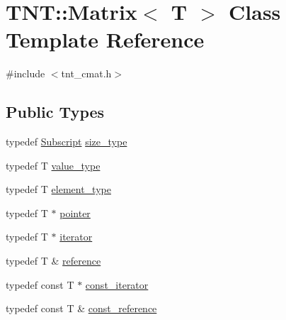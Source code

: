 \hypertarget{classTNT_1_1Matrix}{}\section{T\+NT\+:\+:Matrix$<$ T $>$ Class Template Reference}
\label{classTNT_1_1Matrix}


{\ttfamily \#include $<$tnt\+\_\+cmat.\+h$>$}

\subsection*{Public Types}
\begin{DoxyCompactItemize}
\item 
typedef \hyperlink{namespaceTNT_af22e3f1460e145c04ce4e7d701e4c1c1}{Subscript} \hyperlink{classTNT_1_1Matrix_a42f57fd19de0ba2edce3734f41431727}{size\+\_\+type}
\item 
typedef T \hyperlink{classTNT_1_1Matrix_a869b1a3e56a38bdaeb0b4f698b08e3c5}{value\+\_\+type}
\item 
typedef T \hyperlink{classTNT_1_1Matrix_a8ecf0a648bbfaf636fd78c21b35a0a4d}{element\+\_\+type}
\item 
typedef T $\ast$ \hyperlink{classTNT_1_1Matrix_aa7db7adc5513f7d8bf067965b97d7c42}{pointer}
\item 
typedef T $\ast$ \hyperlink{classTNT_1_1Matrix_a8233a1d03d4cfeab1d7cfec560cd2f0c}{iterator}
\item 
typedef T \& \hyperlink{classTNT_1_1Matrix_a129951783800dd85d3dcc1f6dd2062f9}{reference}
\item 
typedef const T $\ast$ \hyperlink{classTNT_1_1Matrix_a39334142ce0b5ee917e7b222a6b5637b}{const\+\_\+iterator}
\item 
typedef const T \& \hyperlink{classTNT_1_1Matrix_a6d3ceefbf1675aad4acadac4f78ed04b}{const\+\_\+reference}
\end{DoxyCompactItemize}
